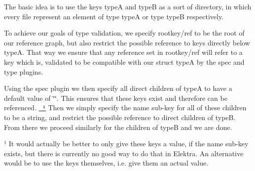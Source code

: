 The basic idea is to use the keys {\ttfamily typeA} and {\ttfamily typeB} as a sort of \textquotesingle{}directory\textquotesingle{}, in which every \textquotesingle{}file\textquotesingle{} represent an element of type {\ttfamily typeA} or type {\ttfamily typeB} respectively.

To achieve our goals of type validation, we specify {\ttfamily rootkey/ref} to be the root of our reference graph, but also restrict the possible reference to keys directly below {\ttfamily typeA}. That way we ensure that any reference set in {\ttfamily rootkey/ref} will refer to a key which is, validated to be compatible with our {\ttfamily struct typeA} by the spec and type plugins.

Using the spec plugin we then specify all direct children of {\ttfamily typeA} to have a default value of {\ttfamily \char`\"{}\char`\"{}}. This ensures that these keys exist and therefore can be referenced. \href{\#note-empty-val}{\texttt{ ¹}} Then we simply specify the {\ttfamily name} sub-\/key for all of these children to be a string, and restrict the possible reference to direct children of {\ttfamily typeB}. From there we proceed similarly for the children of {\ttfamily typeB} and we are done.





¹ It would actually be better to only give these keys a value, if the {\ttfamily name} sub-\/key exists, but there is currently no good way to do that in Elektra. An alternative would be to use the keys themselves, i.\+e. give them an actual value. 